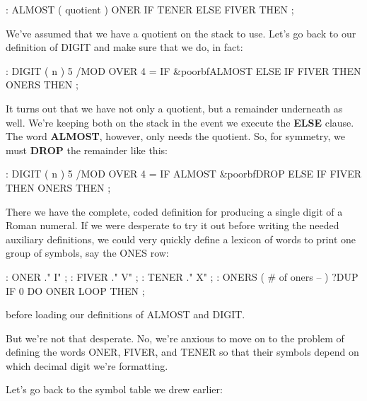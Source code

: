 \begin{Code}
: ALMOST  ( quotient )
     ONER  IF TENER ELSE FIVER THEN ;
\end{Code}
We've assumed that we have a quotient on the stack to use. Let's go back
to our definition of DIGIT and make sure that we do, in fact:

\begin{Code}[commandchars=\&\{\}]
: DIGIT  ( n )
     5 /MOD  OVER 4 =  IF  &poorbf{ALMOST}  ELSE
     IF FIVER THEN  ONERS  THEN ;
\end{Code}
It turns out that we have not only a quotient, but a remainder
underneath as well. We're keeping both on the stack in the event we
execute the \textbf{ELSE} clause. The word \textbf{ALMOST}, however, only needs the
quotient. So, for symmetry, we must \textbf{DROP} the remainder like this:

\begin{Code}[commandchars=\&\{\}]
: DIGIT  ( n )
     5 /MOD  OVER 4 =  IF  ALMOST  &poorbf{DROP}  ELSE
     IF FIVER THEN  ONERS  THEN ;
\end{Code}
There we have the complete, coded definition for producing a single digit
of a Roman numeral. If we were desperate to try it out before writing the
needed auxiliary definitions, we could very quickly define a lexicon of
words to print one group of symbols, say the ONES row:

\begin{Code}
: ONER    ." I" ;
: FIVER   ." V" ;
: TENER   ." X" ;
: ONERS  ( # of oners -- )
     ?DUP IF 0 DO  ONER  LOOP  THEN ;
\end{Code}
before loading our definitions of ALMOST and DIGIT.

But we're not that desperate. No, we're anxious to move on to the
problem of defining the words ONER, FIVER, and TENER so that their
symbols depend on which decimal digit we're formatting.

Let's go back to the symbol table we drew earlier:

\bigskip

